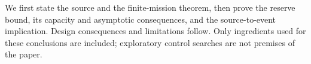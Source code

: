 \documentclass[11pt]{article}
\theoremstyle{remark}\newtheorem{remark}[theorem]{Remark}
\newcommand{\1}{\mathbf 1}
\begin{document}
We first state the source and the finite-mission theorem, then prove the reserve bound, its capacity and asymptotic consequences, and the source-to-event implication. Design consequences and limitations follow. Only ingredients used for these conclusions are included; exploratory control searches are not premises of the paper.









\appendix




\end{document}
